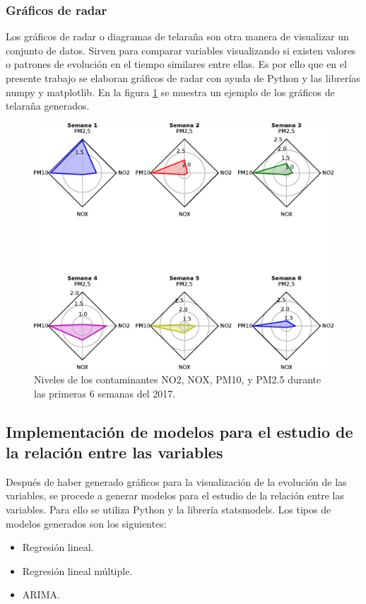 \subsubsection{Gráficos de radar}
Los gráficos de radar o diagramas de telaraña son otra manera de visualizar un conjunto de datos. Sirven para comparar variables visualizando si existen valores o patrones de evolución en el tiempo similares entre ellas. Es por ello que en el presente trabajo se elaboran gráficos de radar con ayuda de Python y las librerías numpy y matplotlib. En la figura \ref{grafico_de_telaraña} se muestra un ejemplo de los gráficos de telaraña generados.
\begin{figure}[h!]
\setcounter{figure}{1} %
\captionsetup{type=figure} %
\begin{center}
   \includegraphics[width=1\textwidth]{Contaminantes-2017.eps}
   \end{center}
    \caption{Niveles de los contaminantes NO2, NOX, PM10, y PM2.5 durante las primeras 6 semanas del 2017.}
    \label{grafico_de_telaraña}
\end{figure}
\clearpage

\subsection{Implementación de modelos para el estudio de la relación entre las variables}
Después de haber generado gráficos para la visualización de la evolución de las variables, se procede a generar modelos para el estudio de la relación entre las variables. Para ello se utiliza Python y la librería statsmodels. Los tipos de modelos generados son los siguientes:
\begin{itemize}
	\item Regresión lineal.
	\item Regresión lineal múltiple.
	\item ARIMA.
\end{itemize}

